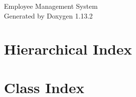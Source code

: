 \documentclass[twoside]{book}
\newcommand{\+}{\discretionary{\mbox{\scriptsize$\hookleftarrow$}}{}{}}
\newcommand{\clearemptydoublepage}{%
    \newpage{\pagestyle{empty}\cleardoublepage}%
  }
\begin{document}
  \raggedbottom
    \hypersetup{pageanchor=false,
                bookmarksnumbered=true,
                pdfencoding=unicode
               }
  \begin{titlepage}
  \vspace*{7cm}
  \begin{center}%
  {\Large Employee Management System}\\
  \vspace*{1cm}
  {\large Generated by Doxygen 1.13.2}\\
  \end{center}
  \end{titlepage}
  \clearemptydoublepage
  \tableofcontents
  \clearemptydoublepage
  \hypersetup{pageanchor=true}
\chapter{Hierarchical Index}

\chapter{Class Index}

\end{document}
